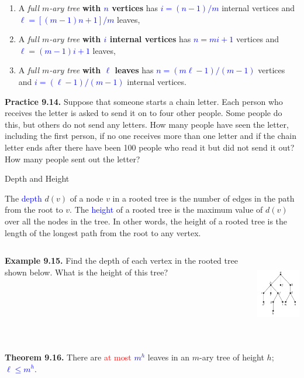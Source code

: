 \documentclass[aspectratio=169]{beamer}
\providecommand{\Blue}[1]{\textcolor{blue}{#1}}
\providecommand{\Red}[1]{\textcolor{red}{#1}}
\begin{document}
\begin{frame}[plain]{}

    \begin{enumerate}
     \item A \emph{full $m$-ary tree} {\bf with \Blue{$n$} vertices} has \Blue{$i=(n-1)/m$} internal vertices
	and \Blue{$\ell=[(m-1)n + 1]/m$} leaves,
      \item A \emph{full $m$-ary tree} {\bf with \Blue{$i$} internal vertices} has \Blue{$n=mi+1$} vertices and
	    \Blue{$\ell=(m-1)i+1$} leaves, 
      \item A \emph{full $m$-ary tree} {\bf with \Blue{$\ell$} leaves} has \Blue{$n=(m\ell-1)/(m-1)$} vertices and
	  \Blue{$i=(\ell-1)/(m-1)$} internal vertices.
    \end{enumerate}
\medskip

{\bf Practice 9.14.}
Suppose that someone starts a chain letter. Each person who receives the letter 
is asked to send
it on to four other people. Some people do this, but others do not send any letters. 
How many
people have seen the letter, including the first person, if no one receives more than one letter
and if the chain letter ends after there have been 100 people who read it
 but did not send it out?
How many people sent out the letter?
\vspace{0.3in}

\end{frame}

\begin{frame}[plain]{Depth and Height}

 The \Blue{depth} $d(v)$ of a node $v$ in a rooted tree is the number of edges
    in the path from the root to $v$. The \Blue{height} of a rooted tree is the maximum value of $d(v)$
    over all the nodes in the tree. 
    In other words, the height of a rooted tree
     is the length of the longest path from the root to any vertex.\pause

\begin{columns}[c]
     {\bf Example 9.15.} Find the depth of each vertex in the rooted tree shown below. 
 What is the height of this tree?
 \vspace{.5in}
 
     \begin{center}
        \includegraphics[height=3.5cm]{./img/lecture9-fig10.png} 
      \end{center}  
  \end{columns}
     \pause
 
 {\bf Theorem 9.16.} There are \Red{at most} \Blue{$m^h$} leaves in an $m$-ary tree of height $h$; 
 \Blue{$\ell \leq m^h$}.
 
\end{frame}
\end{document}
